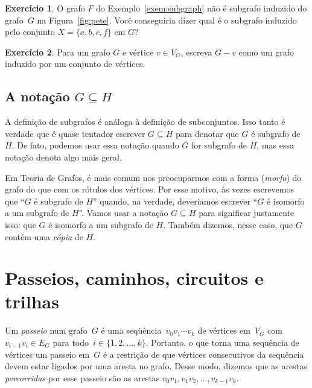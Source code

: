 \documentclass[12pt, a4paper]{article}
\theoremstyle{definition}
\newtheorem{exer}{Exercício}
\begin{document}
\begin{exer}
O grafo $F$ do Exemplo~\ref{exem:subgraph} não é subgrafo induzido do grafo~$G$ na Figura~\ref{fig:pete}. Você conseguiria dizer qual é o subgrafo induzido pelo conjunto  $X = \{a,b,c,f\}$ em $G$? 
\end{exer}

\begin{exer}
Para um grafo $G$ e vértice $v \in V_G$, escreva $G - v$ como um grafo induzido por um conjunto de vértices.
\end{exer}


\subsection{A notação \texorpdfstring{$G \subseteq H$}{G subconjunto de H}}

A definição de subgrafos é análoga à definição de subconjuntos. Isso tanto é verdade que é quase tentador escrever $G \subseteq H$ para denotar que $G$ é subgrafo de $H$. De fato, podemos usar essa notação quando $G$ for subgrafo de $H$, mas essa notação denota algo mais geral.

Em Teoria de Grafos, é mais comum nos preocuparmos com a forma (\emph{morfo}) do grafo do que com os rótulos dos vértices. Por esse motivo, às vezes escrevemos que ``$G$ é subgrafo de $H$'' quando, na verdade, deveríamos escrever ``$G$ é isomorfo a um subgrafo de $H$''. Vamos usar a notação $G \subseteq H$ para significar justamente isso: que $G$ é isomorfo a um subgrafo de $H$. Também dizemos, nesse caso, que $G$ contém uma \emph{cópia} de $H$.

\section{Passeios, caminhos, circuitos e trilhas}

Um \emph{passeio} num grafo~$G$ é uma seqüência~$v_0 v_1
\cdots v_k$ de vértices em~$V_G$ com~$v_{i-1} v_i \in E_G$ para todo~$i \in \{1,2,\dots,k\}$. Portanto, o que torna uma sequência de vértices um passeio em~$G$ é a restrição de que vértices consecutivos da sequência devem estar ligados por uma aresta no grafo. Desse modo, dizemos que as arestas \emph{percorridas} por esse passeio são as arestas $v_0v_1, v_1v_2, \dots, v_{k-1}v_k$.  
\end{document}
